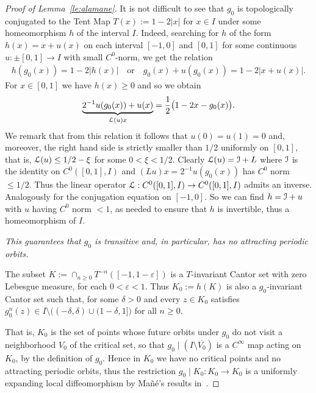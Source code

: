 \documentclass[reqno,12pt,a4paper]{amsart}
\theoremstyle{plain}
\theoremstyle{definition}
\begin{document}
\begin{proof}[Proof of Lemma~\ref{le:alamane}]
  It is not difficult to see that $g_0$ is topologically
  conjugated to the Tent Map $T(x):=1-2|x|$ for $x\in I$
  under some homeomorphism $h$ of the interval $I$.
  Indeed, searching for $h$ of the form $h(x)=x+u(x)$ on each
  interval $[-1,0]$ and $[0,1]$ for some continuous
  $u:\pm[0,1]\to I$  with small $C^0$-norm, we get the relation
  \begin{align*}
    h(g_0(x))=1-2|h(x)|
    \quad\text{or}\quad
    g_0(x) + u(g_0(x))
    = 1-2|x+u(x)|.
  \end{align*}
  For $x\in [0,1]$ we have $h(x)\ge0$ and so we obtain
  \begin{align*}
    \underbrace{2^{-1}
    u(g_0(x))+u(x)}_{{\EuScript{L}}(u)x}=
    \frac12\big(1-2x-g_0(x)\big).
  \end{align*}
  We remark that from this relation it follows that
  $u(0)=u(1)=0$ and, moreover, the right hand side is
  strictly smaller than $1/2$ uniformly on $[0,1]$, that is,
  ${\EuScript{L}}(u)\le1/2-\xi$ for some $0<\xi<1/2$.  Clearly
  ${\EuScript{L}}(u)={\EuScript{I}}+L$ where ${\EuScript{I}}$ is the identity on
  $C^0([0,1],I)$ and $(Lu)x=2^{-1}u( g_0(x) )$ has $C^0$
  norm $\le1/2$. Thus the linear operator ${\EuScript{L}}:
  C^0([0,1],I)\to C^0([0,1],I)$ admits an
  inverse. Analogously for the conjugation equation on
  $[-1,0]$. So we can find $h={\EuScript{I}}+u$ with $u$ having $C^0$
  norm $<1$, as needed to ensure that $h$ is invertible,
  thus a homeomorphism of $I$.

  \emph{This guarantees that $g_0$ is transitive and, in
    particular, has no attracting periodic orbits.}

  The subset $K:=\cap_{n\ge0} T^{-n}([-1,1-{\varepsilon}])$ is a
  $T$-invariant Cantor set with zero Lebesgue measure, for
  each $0<{\varepsilon}<1$. Thus $K_0:=h(K)$ is also a
  $g_0$-invariant Cantor set such that, for some $\delta>0$
  and every $z\in K_0$ satisfies $g_0^n(z)\in
  I\setminus\big( (-\delta,\delta)\cup (1-\delta,1] \big)$
  for all $n\ge0$. 

  That is, $K_0$ is the set of points whose future orbits
  under $g_0$ do not visit a neighborhood $V_0$ of the
  critical set, so that $g_0\mid (I\setminus
  \overline{V_0})$ is a $C^\infty$ map acting on $K_0$, by
  the definition of $g_0$.  Hence in $K_0$ we have no
  critical points and no attracting periodic orbits, thus
  the restriction $g_0\mid K_0: K_0\to K_0$ is a uniformly
  expanding local diffeomorphism by Ma\~n\'e's results
  in~\cite{Man85}.


\end{proof}
\end{document}
